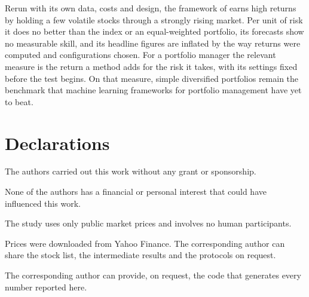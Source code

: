 Rerun with its own data, costs and design, the framework of \citet{dastkhan2026} earns high returns by holding a few volatile stocks through a strongly rising market. Per unit of risk it does no better than the index or an equal-weighted portfolio, its forecasts show no measurable skill, and its headline figures are inflated by the way returns were computed and configurations chosen. For a portfolio manager the relevant measure is the return a method adds for the risk it takes, with its settings fixed before the test begins. On that measure, simple diversified portfolios remain the benchmark that machine learning frameworks for portfolio management have yet to beat.

\backmatter

\section*{Declarations}

 The authors carried out this work without any grant or sponsorship.

 None of the authors has a financial or personal interest that could have influenced this work.

 The study uses only public market prices and involves no human participants.

 Prices were downloaded from Yahoo Finance. The corresponding author can share the stock list, the intermediate results and the protocols on request.

 The corresponding author can provide, on request, the code that generates every number reported here.

